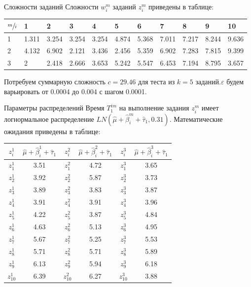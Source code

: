 \documentclass[aspectratio=169]{beamer}
\begin{document}
    \begin{frame}{Сложности заданий}
        Сложности $w_i^m$ заданий $z_i^m$ приведены в таблице:
        
        \begin{table}[]
\begin{tabular}{|l|l|l|l|l|l|l|l|l|l|l|}
\hline
$\sfrac{m}{i}$ & 1     & 2     & 3     & 4     & 5     & 6     & 7     & 8     & 9     & 10    \\ \hline
1   & 1.311 & 3.254 & 3.254 & 3.254 & 4.874 & 5.368 & 7.011 & 7.217 & 8.244 & 9.636 \\ \hline
2   & 4.132 & 6.902 & 2.121 & 3.436 & 2.456 & 5.359 & 6.902 & 7.283 & 7.815 & 9.399 \\ \hline
3   & 2     & 2.418 & 2.666 & 3.653 & 5.242 & 5.547 & 6.453 & 7.194 & 8.795 & 3.657 \\ \hline
\end{tabular}
\end{table}

	Потребуем суммарную сложность $c=29.46$ для теста из $k=5$ заданий.\newline $\varepsilon$ будем варьировать от 0.0004 до 0.004 с шагом 0.0001.
	
    \end{frame}
    
    \begin{frame}{Параметры распределений}
        Время $T_1^{im}$ на выполнение задания $z_i^m$ имеет логнормальное распределение $LN(\hat{\mu}+\hat{\beta}_i^m+\hat{\tau}_1, 0.31)$. Математические ожидания приведены в таблице:
    
    \begin{table}[]
\begin{tabular}{|c|c|c|c|c|c|}
\hline
$z_i^1$ & $\hat{\mu}+\hat{\beta}_i^1+\hat{\tau}_1$ & $z_i^2$ & $\hat{\mu}+\hat{\beta}_i^2+\hat{\tau}_1$ & $z_i^3$ & $\hat{\mu}+\hat{\beta}_i^3+\hat{\tau}_1$ \\ \hline
$z_1^1$ & 3.51 & $z_1^2$ & 4.72 & $z_1^3$ & 3.65 \\ \hline
$z_2^1$ & 3.92 & $z_2^2$ & 5.87 & $z_2^3$ & 3.73 \\ \hline
$z_3^1$ & 3.89 & $z_3^2$ & 3.83 & $z_3^3$ & 3.87 \\ \hline
$z_4^1$ & 3.91 & $z_4^2$ & 3.91 & $z_4^3$ & 3.96 \\ \hline
$z_5^1$ & 4.22 & $z_5^2$ & 3.87 & $z_5^3$ & 4.84 \\ \hline
$z_6^1$ & 4.63 & $z_6^2$ & 5.13 & $z_6^3$ & 4.95 \\ \hline
$z_7^1$ & 5.67 & $z_7^2$ & 5.25 & $z_7^3$ & 5.53 \\ \hline
$z_8^1$ & 5.71 & $z_8^2$ & 5.71 & $z_8^3$ & 5.89 \\ \hline
$z_9^1$ & 6.13 & $z_9^2$ & 5.94 & $z_9^3$ & 6.18 \\ \hline
$z_{10}^1$ & 6.39 & $z_{10}^2$ & 6.27 & $z_{10}^3$ & 3.88 \\ \hline
\end{tabular}
\end{table}
    \end{frame}
    
\end{document}
